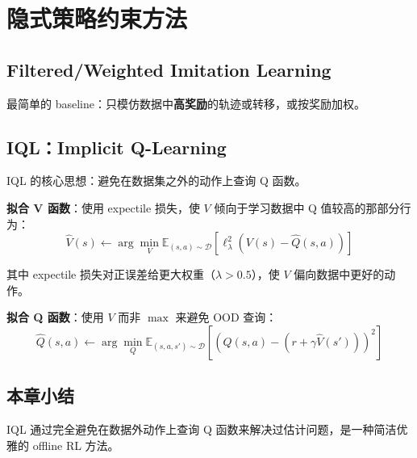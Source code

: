 \section{隐式策略约束方法}

\subsection{Filtered/Weighted Imitation Learning}

最简单的 baseline：只模仿数据中\textbf{高奖励}的轨迹或转移，或按奖励加权。

\subsection{IQL：Implicit Q-Learning}

IQL 的核心思想：避免在数据集之外的动作上查询 Q 函数。

\textbf{拟合 V 函数}：使用 expectile 损失，使 $V$ 倾向于学习数据中 Q 值较高的那部分行为：
$$\hat{V}(s) \leftarrow \arg\min_{V} \mathbb{E}_{(s,a) \sim \mathcal{D}} \left[\ell_\lambda^2\left(V(s) - \hat{Q}(s, a)\right)\right]$$

其中 expectile 损失对正误差给更大权重（$\lambda > 0.5$），使 $V$ 偏向数据中更好的动作。

\textbf{拟合 Q 函数}：使用 $V$ 而非 $\max$ 来避免 OOD 查询：
$$\hat{Q}(s, a) \leftarrow \arg\min_{Q} \mathbb{E}_{(s,a,s') \sim \mathcal{D}} \left[\left(Q(s,a) - (r + \gamma \hat{V}(s'))\right)^2\right]$$

\subsection{本章小结}

IQL 通过完全避免在数据外动作上查询 Q 函数来解决过估计问题，是一种简洁优雅的 offline RL 方法。

